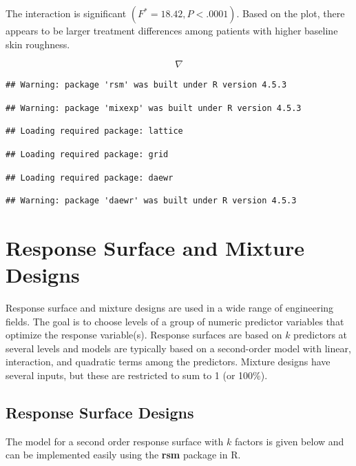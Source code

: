 \documentclass[
]{book}
\begin{document}
The interaction is significant \((F^*=18.42, P<.0001)\). Based on the
plot, there appears to be larger treatment differences among patients
with higher baseline skin roughness.

\[\nabla \]

\begin{verbatim}
## Warning: package 'rsm' was built under R version 4.5.3
\end{verbatim}

\begin{verbatim}
## Warning: package 'mixexp' was built under R version 4.5.3
\end{verbatim}

\begin{verbatim}
## Loading required package: lattice
\end{verbatim}

\begin{verbatim}
## Loading required package: grid
\end{verbatim}

\begin{verbatim}
## Loading required package: daewr
\end{verbatim}

\begin{verbatim}
## Warning: package 'daewr' was built under R version 4.5.3
\end{verbatim}

\chapter{Response Surface and Mixture
Designs}\label{response-surface-and-mixture-designs}

Response surface and mixture designs are used in a wide range of
engineering fields. The goal is to choose levels of a group of numeric
predictor variables that optimize the response variable(s). Response
surfaces are based on \(k\) predictors at several levels and models are
typically based on a second-order model with linear, interaction, and
quadratic terms among the predictors. Mixture designs have several
inputs, but these are restricted to sum to 1 (or 100\%).

\section{Response Surface Designs}\label{response-surface-designs}

The model for a second order response surface with \(k\) factors is
given below and can be implemented easily using the \textbf{rsm} package
in R.
\end{document}
